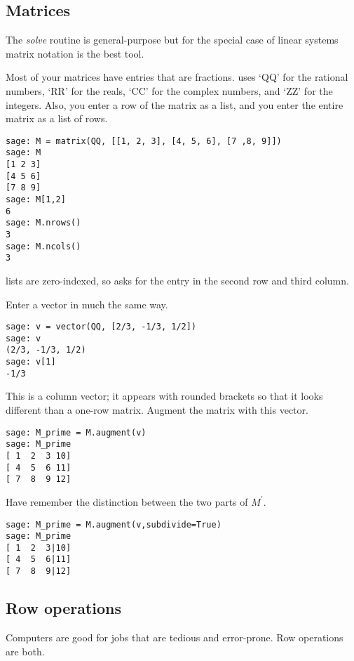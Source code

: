 \subsection{Matrices}
The \textit{solve} routine is general-purpose but 
for the special case of linear systems matrix notation is the best tool.
 
Most of your matrices have entries that are fractions.
\Sage{} uses `QQ' for the rational numbers,
`RR' for the reals,
`CC' for the complex numbers,
and
`ZZ' for the integers.
Also, you enter a row of the matrix as a list, and
you enter the entire matrix as a list of rows.
\begin{lstlisting}
sage: M = matrix(QQ, [[1, 2, 3], [4, 5, 6], [7 ,8, 9]])
sage: M
[1 2 3]
[4 5 6]
[7 8 9]
sage: M[1,2]
6
sage: M.nrows()
3
sage: M.ncols()
3
\end{lstlisting}
\Sage{} lists are zero-indexed, so  asks
for the entry in the second row and third column. 

Enter a vector in much the same way.
\begin{lstlisting}
sage: v = vector(QQ, [2/3, -1/3, 1/2])
sage: v
(2/3, -1/3, 1/2)
sage: v[1]
-1/3
\end{lstlisting}
This is a column vector; 
it appears with rounded brackets so that 
it looks different than a one-row matrix.
Augment the matrix with this vector.
\begin{lstlisting}
sage: M_prime = M.augment(v)
sage: M_prime
[ 1  2  3 10]
[ 4  5  6 11]
[ 7  8  9 12]  
\end{lstlisting}
Have \Sage{} remember the distinction between the two parts 
of $M^\prime$.
\begin{lstlisting}
sage: M_prime = M.augment(v,subdivide=True)
sage: M_prime                              
[ 1  2  3|10]
[ 4  5  6|11]
[ 7  8  9|12] 
\end{lstlisting}



\subsection{Row operations}
Computers are good for jobs that are tedious and error-prone.
Row operations are both.

